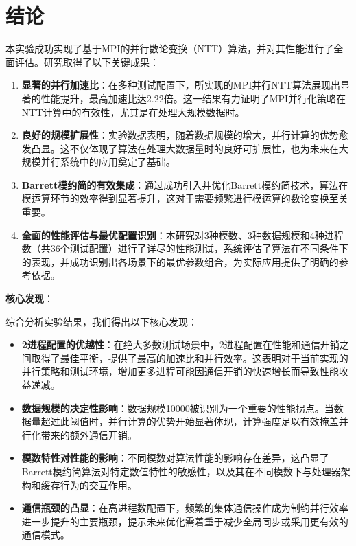 \documentclass[a4paper]{article}
\begin{document}
\section{结论}

本实验成功实现了基于MPI的并行数论变换（NTT）算法，并对其性能进行了全面评估。研究取得了以下关键成果：

\begin{enumerate}
  \item \textbf{显著的并行加速比}：在多种测试配置下，所实现的MPI并行NTT算法展现出显著的性能提升，最高加速比达2.22倍。这一结果有力证明了MPI并行化策略在NTT计算中的有效性，尤其是在处理大规模数据时。
  \item \textbf{良好的规模扩展性}：实验数据表明，随着数据规模的增大，并行计算的优势愈发凸显。这不仅体现了算法在处理大数据量时的良好可扩展性，也为未来在大规模并行系统中的应用奠定了基础。
  \item \textbf{Barrett模约简的有效集成}：通过成功引入并优化Barrett模约简技术，算法在模运算环节的效率得到显著提升，这对于需要频繁进行模运算的数论变换至关重要。
  \item \textbf{全面的性能评估与最优配置识别}：本研究对3种模数、3种数据规模和4种进程数（共36个测试配置）进行了详尽的性能测试，系统评估了算法在不同条件下的表现，并成功识别出各场景下的最优参数组合，为实际应用提供了明确的参考依据。
\end{enumerate}

\textbf{核心发现}：

综合分析实验结果，我们得出以下核心发现：

\begin{itemize}
  \item \textbf{2进程配置的优越性}：在绝大多数测试场景中，2进程配置在性能和通信开销之间取得了最佳平衡，提供了最高的加速比和并行效率。这表明对于当前实现的并行策略和测试环境，增加更多进程可能因通信开销的快速增长而导致性能收益递减。
  \item \textbf{数据规模的决定性影响}：数据规模10000被识别为一个重要的性能拐点。当数据量超过此阈值时，并行计算的优势开始显著体现，计算强度足以有效掩盖并行化带来的额外通信开销。
  \item \textbf{模数特性对性能的影响}：不同模数对算法性能的影响存在差异，这凸显了Barrett模约简算法对特定数值特性的敏感性，以及其在不同模数下与处理器架构和缓存行为的交互作用。
  \item \textbf{通信瓶颈的凸显}：在高进程数配置下，频繁的集体通信操作成为制约并行效率进一步提升的主要瓶颈，提示未来优化需着重于减少全局同步或采用更有效的通信模式。
\end{itemize}
\end{document}
